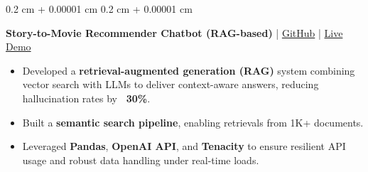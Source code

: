 \documentclass[10pt, letterpaper]{article}
\newenvironment{highlights}{
    \begin{itemize}[
        topsep=0.10 cm,
        parsep=0.10 cm,
        partopsep=0pt,
        itemsep=0pt,
        leftmargin=0.4 cm + 10pt
    ]
}{
    \end{itemize}
} %
\newenvironment{onecolentry}{
    \begin{adjustwidth}{
        0.2 cm + 0.00001 cm
    }{
        0.2 cm + 0.00001 cm
    }
}{
    \end{adjustwidth}
} %
\newenvironment{twocolentry}[2][]{
    \onecolentry
    \def\secondColumn{#2}
    \setcolumnwidth{\fill, 4.5 cm}
    \begin{paracol}{2}
}{
    \switchcolumn \raggedleft \secondColumn
    \end{paracol}
    \endonecolentry
} %
\let\hrefWithoutArrow\href
\renewcommand{\href}[2]{\hrefWithoutArrow{#1}{#2}}
\begin{document}
\begin{onecolentry}
\textbf{Story-to-Movie Recommender Chatbot (RAG-based)} | \href{https://github.com/elewah/Chatbot-Story-To-Movie}{GitHub} | \href{https://chatbot-story-to-movie.streamlit.app/}{Live Demo}
\begin{highlights}
\item Developed a \textbf{retrieval-augmented generation (RAG)} system combining vector search with LLMs to deliver context-aware answers, reducing hallucination rates by \textbf{~30\%}.
\item Built a \textbf{semantic search pipeline}, enabling retrievals from 1K+ documents.
\item Leveraged \textbf{Pandas}, \textbf{OpenAI API}, and \textbf{Tenacity} to ensure resilient API usage and robust data handling under real-time loads.
\end{highlights}
\end{onecolentry}


       



\end{document}
